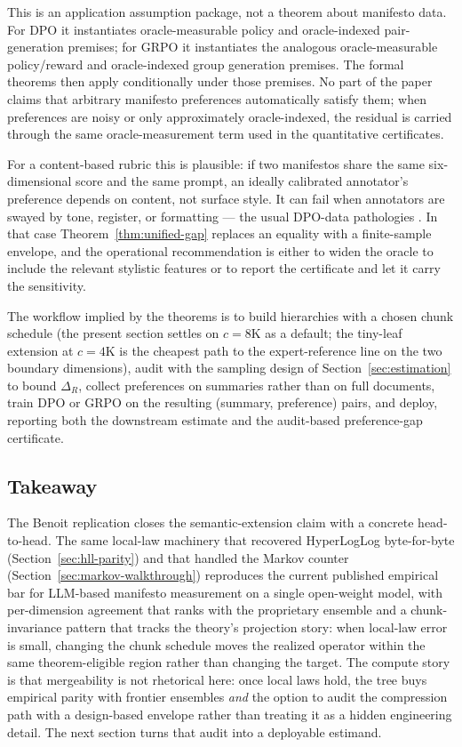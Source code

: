 This is an application assumption package, not a theorem about manifesto
data. For DPO it instantiates oracle-measurable policy and
oracle-indexed pair-generation premises; for GRPO it instantiates the
analogous oracle-measurable policy/reward and oracle-indexed group
generation premises. The formal theorems then apply conditionally under
those premises. No part of the paper claims that arbitrary manifesto
preferences automatically satisfy them; when preferences are noisy or only
approximately oracle-indexed, the residual is carried through the same
oracle-measurement term used in the quantitative certificates.

For a content-based rubric this is plausible: if two manifestos share
the same six-dimensional score and the same prompt, an ideally
calibrated annotator's preference depends on content, not surface
style. It can fail when annotators are swayed by tone, register, or
formatting --- the usual DPO-data pathologies \citep{RafailovEtAl2023DPO}.
In that case Theorem~\ref{thm:unified-gap} replaces an equality with a
finite-sample envelope, and the operational recommendation is either
to widen the oracle to include the relevant stylistic features or to
report the certificate and let it carry the sensitivity.

The workflow implied by the theorems is to build hierarchies with a chosen chunk schedule (the present section settles on $c = 8\mathrm{K}$ as a default; the tiny-leaf extension at $c = 4\mathrm{K}$ is the cheapest path to the expert-reference line on the two boundary dimensions), audit with the sampling design of Section~\ref{sec:estimation} to bound $\Delta_R$, collect preferences on summaries rather than on full documents, train DPO or GRPO on the resulting (summary, preference) pairs, and deploy, reporting both the downstream estimate and the audit-based preference-gap certificate.

\subsection{Takeaway}

The Benoit replication closes the semantic-extension claim with a
concrete head-to-head. The same local-law machinery that recovered
HyperLogLog byte-for-byte (Section~\ref{sec:hll-parity}) and that
handled the Markov counter (Section~\ref{sec:markov-walkthrough})
reproduces the current published empirical bar for LLM-based
manifesto measurement on a single open-weight model, with per-dimension
agreement that ranks with the proprietary ensemble and a chunk-invariance
pattern that tracks the theory's projection story: when local-law error is
small, changing the chunk schedule moves the realized operator within the
same theorem-eligible region rather than changing the target. The compute story is that
mergeability is not rhetorical here: once local laws hold, the tree
buys empirical parity with frontier ensembles \emph{and} the option to
audit the compression path with a design-based envelope rather than
treating it as a hidden engineering detail. The next section turns
that audit into a deployable estimand.
